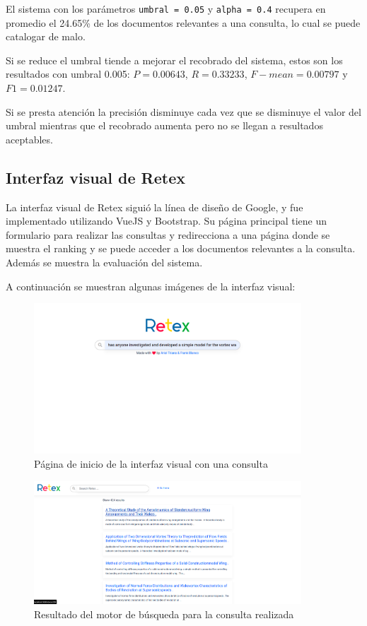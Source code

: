 El sistema con los parámetros \verb|umbral = 0.05| y \verb|alpha = 0.4| recupera en promedio el 24.65\% de los documentos relevantes a una consulta, lo cual se puede catalogar de malo. 

Si se reduce el umbral tiende a mejorar el recobrado del sistema, estos son los resultados con umbral 0.005: $P = 0.00643$, $R = 0.33233$, $F-mean = 0.00797$ y $F1 = 0.01247$. 

Si se presta atención la precisión disminuye cada vez que se disminuye el valor del umbral mientras que el recobrado aumenta pero no se llegan a resultados aceptables.

\subsection{Interfaz visual de Retex}

La interfaz visual de Retex siguió la línea de diseño de Google, y fue implementado utilizando VueJS y Bootstrap. Su página principal tiene un formulario para realizar las consultas y redirecciona a una página donde se muestra el ranking y se puede acceder a los documentos relevantes a la consulta. Además se muestra la evaluación del sistema.

A continuación se muestran algunas imágenes de la interfaz visual:

\begin{figure}
    \includegraphics[width=10cm]{sections/img/home.png}
    \caption{Página de inicio de la interfaz visual con una consulta}
\end{figure}

\begin{figure}
    \includegraphics[width=10cm]{sections/img/result.png}
    \caption{Resultado del motor de búsqueda para la consulta realizada}
\end{figure}

